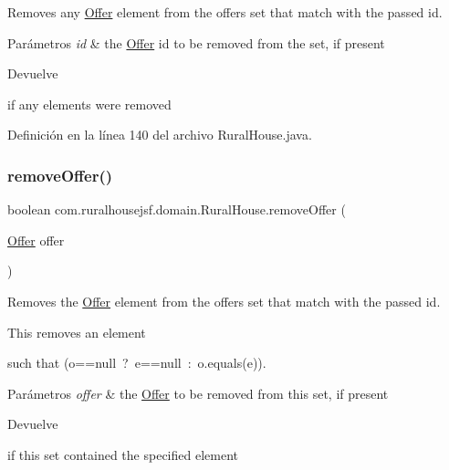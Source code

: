 Removes any \mbox{\hyperlink{classcom_1_1ruralhousejsf_1_1domain_1_1_offer}{Offer}} element from the offers set that match with the passed id. 


\begin{DoxyParams}{Parámetros}
{\em id} & the \mbox{\hyperlink{classcom_1_1ruralhousejsf_1_1domain_1_1_offer}{Offer}} id to be removed from the set, if present \\
\hline
\end{DoxyParams}
\begin{DoxyReturn}{Devuelve}

\begin{DoxyCode}{0}
\DoxyCodeLine{\textcolor{keyword}{true} }
\end{DoxyCode}
 if any elements were removed 
\end{DoxyReturn}


Definición en la línea 140 del archivo Rural\+House.\+java.

\mbox{\label{classcom_1_1ruralhousejsf_1_1domain_1_1_rural_house_a36466194bda46f454c816aa5845c0d14}} 
\subsubsection{\texorpdfstring{removeOffer()}{removeOffer()}\hspace{0.1cm}{\footnotesize\ttfamily [2/2]}}
{\footnotesize\ttfamily boolean com.\+ruralhousejsf.\+domain.\+Rural\+House.\+remove\+Offer (\begin{DoxyParamCaption}\item[{\mbox{\hyperlink{classcom_1_1ruralhousejsf_1_1domain_1_1_offer}{Offer}}}]{offer }\end{DoxyParamCaption})}



Removes the \mbox{\hyperlink{classcom_1_1ruralhousejsf_1_1domain_1_1_offer}{Offer}} element from the offers set that match with the passed id. 

This removes an element
\begin{DoxyCode}{0}
\end{DoxyCode}
 such that {\ttfamily (o==null~?~e==null~\+:~o.\+equals(e))}.


\begin{DoxyParams}{Parámetros}
{\em offer} & the \mbox{\hyperlink{classcom_1_1ruralhousejsf_1_1domain_1_1_offer}{Offer}} to be removed from this set, if present \\
\hline
\end{DoxyParams}
\begin{DoxyReturn}{Devuelve}

\begin{DoxyCode}{0}
\DoxyCodeLine{\textcolor{keyword}{true} }
\end{DoxyCode}
 if this set contained the specified element 
\end{DoxyReturn}


